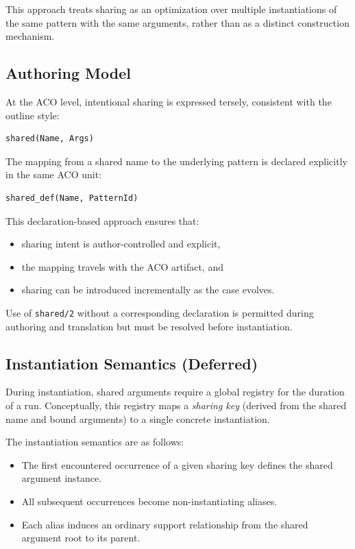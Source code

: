 \documentclass[12pt,twoside,a4paper]{article}
\begin{document}
This approach treats sharing as an optimization over multiple instantiations of the same pattern with the same arguments, rather than as a distinct construction mechanism.

\subsection{Authoring Model}

At the ACO level, intentional sharing is expressed tersely, consistent with the outline style:

\begin{verbatim}
shared(Name, Args)
\end{verbatim}

The mapping from a shared name to the underlying pattern is declared explicitly in the same ACO unit:

\begin{verbatim}
shared_def(Name, PatternId)
\end{verbatim}

This declaration-based approach ensures that:
\begin{itemize}
  \item sharing intent is author-controlled and explicit,
  \item the mapping travels with the ACO artifact, and
  \item sharing can be introduced incrementally as the case evolves.
\end{itemize}

Use of \texttt{shared/2} without a corresponding declaration is permitted during authoring and translation but must be resolved before instantiation.

\subsection{Instantiation Semantics (Deferred)}

During instantiation, shared arguments require a global registry for the duration of a run. Conceptually, this registry maps a \emph{sharing key} (derived from the shared name and bound arguments) to a single concrete instantiation.

The instantiation semantics are as follows:
\begin{itemize}
  \item The first encountered occurrence of a given sharing key defines the shared argument instance.
  \item All subsequent occurrences become non-instantiating aliases.
  \item Each alias induces an ordinary support relationship from the shared argument root to its parent.
\end{itemize}
\end{document}
